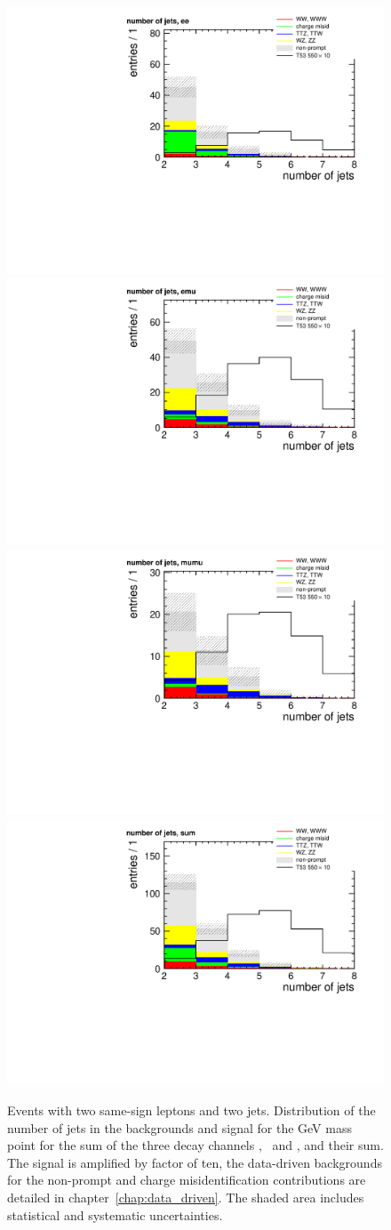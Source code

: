 \begin{figure}[htb]
    \centering
    \includegraphics[width=.49\textwidth]{images/pdf/same-sign,_2_jets/n_jets_ee_0}
    \includegraphics[width=.49\textwidth]{images/pdf/same-sign,_2_jets/n_jets_emu_0}\\
    \includegraphics[width=.49\textwidth]{images/pdf/same-sign,_2_jets/n_jets_mumu_0}
    \includegraphics[width=.49\textwidth]{images/pdf/same-sign,_2_jets/n_jets_sum_0}
    \caption{Events with two same-sign leptons and two jets. Distribution of the number of jets in the backgrounds and
        signal for the \unit[550]{GeV} mass point for the sum of the three
        decay channels \E\E, \E\M\ and \M\M, and their sum. The signal is
    amplified by factor of ten, the data-driven backgrounds for the
non-prompt and charge misidentification contributions are detailed in
chapter~\ref{chap:data_driven}. The shaded area includes statistical and
systematic uncertainties.}
    \label{fig:n_jets}
\end{figure}

